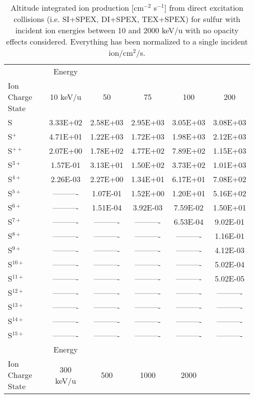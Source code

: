 \begin{table}[ht]
    \centering
    \caption{Altitude integrated ion production [cm$^{-2}$ s$^{-1}$] from direct excitation collisions (i.e. SI+SPEX, DI+SPEX, TEX+SPEX) for sulfur with incident ion energies between 10 and 2000 keV/u with no opacity effects considered. Everything has been normalized to a single incident ion/cm$^2$/s.}
    \begin{tabular}{l|c|c|c|c|c}
    \hline
    & Energy & & & & \\
    Ion Charge State & 10 keV/u & 50 & 75 & 100 & 200 \\
    \hline
    S         & 3.33E+02 & 2.58E+03 & 2.95E+03 & 3.05E+03 & 3.08E+03 \\
    S$^+$     & 4.71E+01 & 1.22E+03 & 1.72E+03 & 1.98E+03 & 2.12E+03 \\
    S$^{ ++}$ & 2.07E+00 & 1.78E+02 & 4.77E+02 & 7.89E+02 & 1.15E+03 \\
    S$^{ 3+}$ & 1.57E-01 & 3.13E+01 & 1.50E+02 & 3.73E+02 & 1.01E+03 \\
    S$^{ 4+}$ & 2.26E-03 & 2.27E+00 & 1.34E+01 & 6.17E+01 & 7.08E+02 \\
    S$^{ 5+}$ & ---------- & 1.07E-01 & 1.52E+00 & 1.20E+01 & 5.16E+02 \\
    S$^{ 6+}$ & ---------- & 1.51E-04 & 3.92E-03 & 7.59E-02 & 1.50E+01 \\
    S$^{ 7+}$ & ---------- & ---------- & ---------- & 6.53E-04 & 9.02E-01 \\
    S$^{ 8+}$ & ---------- & ---------- & ---------- & ---------- & 1.16E-01 \\
    S$^{ 9+}$ & ---------- & ---------- & ---------- & ---------- & 4.12E-03 \\
    S$^{10+}$ & ---------- & ---------- & ---------- & ---------- & 5.02E-04 \\
    S$^{11+}$ & ---------- & ---------- & ---------- & ---------- & 5.02E-05 \\
    S$^{12+}$ & ---------- & ---------- & ---------- & ---------- & ---------- \\
    S$^{13+}$ & ---------- & ---------- & ---------- & ---------- & ---------- \\
    S$^{14+}$ & ---------- & ---------- & ---------- & ---------- & ---------- \\
    S$^{15+}$ & ---------- & ---------- & ---------- & ---------- & ---------- \\
    \hline
    \hline
    & Energy & & & & \\
    Ion Charge State & 300 keV/u & 500 & 1000 & 2000 & \\

\end{tabular}
\end{table}
